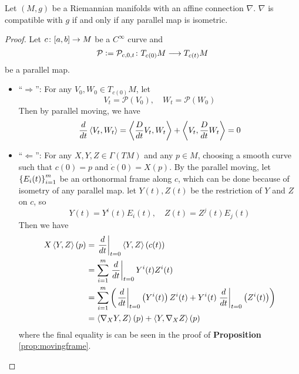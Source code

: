 \begin{enumerate}[label=\arabic{*}.]
	\begin{prop}
		Let $(M,g)$ be a Riemannian manifolds with an affine connection $\nabla$. $\nabla$ is compatible with $g$ if and only if any parallel map is isometric.
	\end{prop}
	\begin{proof}
		Let $c \colon [a,b] \rightarrow M$ be a $C^\infty$ curve and
		\begin{equation*}
			\mathcal{P} \vcentcolon= \mathcal{P}_{c,0,t} \colon T_{c(0)}M \longrightarrow T_{c(t)}M
		\end{equation*}
		be a parallel map.
		\begin{itemize}
			\item ``$\Rightarrow$'': For any $V_0,W_0 \in T_{c(0)}M$, let
			\begin{equation*}
				V_t = \mathcal{P}(V_0),\quad W_t = \mathcal{P}(W_0)
			\end{equation*}
			Then by parallel moving, we have
			\begin{equation*}
				\frac{d}{dt}\left\langle V_t,W_t \right\rangle = \left\langle \frac{D}{dt}V_t,W_t \right\rangle+\left\langle V_t,\frac{D}{dt}W_t \right\rangle = 0
			\end{equation*}
			\item ``$\Leftarrow$'': For any $X,Y,Z \in \Gamma(TM)$ and any $p \in M$, choosing a smooth curve such that $c(0) = p$ and $\dot{c}(0) = X(p)$. By the parallel moving, let $\left\{E_i(t)\right\}_{i=1}^m$ be an orthonormal frame along $c$, which can be done because of isometry of any parallel map. let $Y(t),Z(t)$ be the restriction of $Y$ and $Z$ on $c$, so
			\begin{equation*}
				Y(t) = Y^i(t)E_i(t),\quad Z(t) = Z^j(t)E_j(t)
			\end{equation*}
			Then we have
			\begin{equation*}
				\begin{aligned}
					X\left\langle Y,Z \right\rangle(p) &= \left.\frac{d}{dt}\right\lvert_{t=0}\left\langle Y,Z \right\rangle(c(t)) \\
					&= \sum_{i=1}^m\left.\frac{d}{dt}\right\lvert_{t=0}Y^i(t)Z^i(t)\\
					&= \sum_{i=1}^m\left(\left.\frac{d}{dt}\right\lvert_{t=0}\left(Y^i(t)\right)Z^i(t) + Y^i(t)\left.\frac{d}{dt}\right\lvert_{t=0}\left(Z^i(t)\right)\right)\\
					&= \left\langle \nabla_XY,Z \right\rangle(p)+\left\langle Y,\nabla_XZ \right\rangle(p)
				\end{aligned}
			\end{equation*}
			where the final equality is can be seen in the proof of \textbf{Proposition} \ref{prop:movingframe}.\qedhere
		\end{itemize}
	\end{proof}


\end{enumerate}
